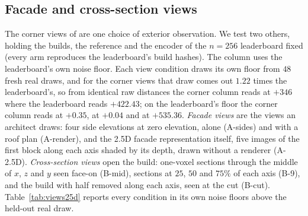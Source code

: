 \subsection{Facade and cross-section views}
\label{app:views25d}

The corner views of \mvkid{} are one choice of exterior observation. We test two others,
holding the builds, the reference and the encoder of the $n{=}256$ leaderboard fixed
(every arm reproduces the leaderboard's build hashes). The \vkid{} column uses the
leaderboard's own noise floor. Each view condition draws its own floor from $48$ fresh real
draws, and for the corner views that draw comes out $1.22$ times the leaderboard's, so from
identical raw distances the corner column reads \matshuffle{} at $+346$ where the
leaderboard reads $+422.43$; on the leaderboard's floor the corner column reads \solidify{}
at $+0.35$, \hollow{} at $+0.04$ and \monochrome{} at $+535.36$. \emph{Facade
views} are the views an architect draws: four side elevations at zero elevation, alone
(A-sides) and with a roof plan (A-render), and the 2.5D facade representation itself,
five images of the first block along each axis shaded by its depth, drawn without a
renderer (A-2.5D). \emph{Cross-section views} open the build: one-voxel sections through
the middle of $x$, $z$ and $y$ seen face-on (B-mid), sections at $25$, $50$ and $75\%$ of
each axis (B-9), and the build with half removed along each axis, seen at the cut
(B-cut). Table~\ref{tab:views25d} reports every condition in its own noise floors above
the held-out real draw.

